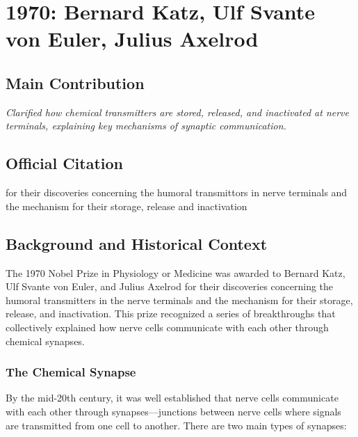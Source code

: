 \chapter[1970 --- Katz, von Euler, and Axelrod]{1970: Bernard Katz, Ulf Svante von Euler, Julius Axelrod}
\label{ch:1970_Katz}

\section*{Main Contribution}

\textit{Clarified how chemical transmitters are stored, released, and inactivated at nerve terminals, explaining key mechanisms of synaptic communication.}\cite{nobel-1970,lecture-1970,lecture-euler-1970,lecture-axelrod-1970}

\section{Official Citation}

for their discoveries concerning the humoral transmittors in nerve terminals and the mechanism for their storage, release and inactivation

\section{Background and Historical Context}

The 1970 Nobel Prize in Physiology or Medicine was awarded to Bernard Katz, Ulf Svante von Euler, and Julius Axelrod for their discoveries concerning the humoral transmitters in the nerve terminals and the mechanism for their storage, release, and inactivation. This prize recognized a series of breakthroughs that collectively explained how nerve cells communicate with each other through chemical synapses.

\subsection{The Chemical Synapse}

By the mid-20th century, it was well established that nerve cells communicate with each other through synapses---junctions between nerve cells where signals are transmitted from one cell to another. There are two main types of synapses:

